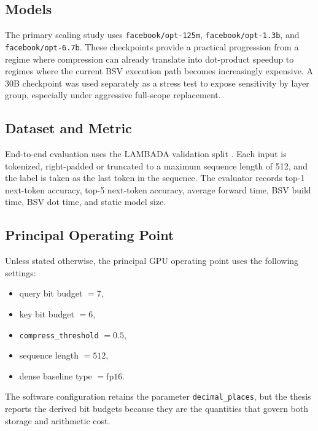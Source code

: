 \subsection{Models}
The primary scaling study uses \texttt{facebook/opt-125m}, \texttt{facebook/opt-1.3b}, and \texttt{facebook/opt-6.7b}. These checkpoints provide a practical progression from a regime where compression can already translate into dot-product speedup to regimes where the current BSV execution path becomes increasingly expensive. A 30B checkpoint was used separately as a stress test to expose sensitivity by layer group, especially under aggressive full-scope replacement.

\subsection{Dataset and Metric}
End-to-end evaluation uses the LAMBADA validation split \cite{lambada}. Each input is tokenized, right-padded or truncated to a maximum sequence length of 512, and the label is taken as the last token in the sequence. The evaluator records top-1 next-token accuracy, top-5 next-token accuracy, average forward time, BSV build time, BSV dot time, and static model size.

\subsection{Principal Operating Point}
Unless stated otherwise, the principal GPU operating point uses the following settings:
\begin{itemize}[leftmargin=2em]
\item query bit budget $= 7$,
\item key bit budget $= 6$,
\item \texttt{compress\_threshold} $= 0.5$,
\item sequence length $= 512$,
\item dense baseline type $= \mathrm{fp16}$.
\end{itemize}
The software configuration retains the parameter \texttt{decimal\_places}, but the thesis reports the derived bit budgets because they are the quantities that govern both storage and arithmetic cost.

